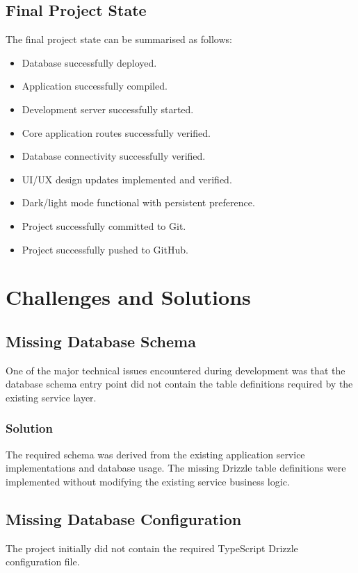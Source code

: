 \documentclass[12pt,a4paper]{report}
\begin{document}
\section{Final Project State}
The final project state can be summarised as follows:

\begin{itemize}[noitemsep]
  \item Database successfully deployed.
  \item Application successfully compiled.
  \item Development server successfully started.
  \item Core application routes successfully verified.
  \item Database connectivity successfully verified.
  \item UI/UX design updates implemented and verified.
  \item Dark/light mode functional with persistent preference.
  \item Project successfully committed to Git.
  \item Project successfully pushed to GitHub.
\end{itemize}

\chapter{Challenges and Solutions}

\section{Missing Database Schema}
One of the major technical issues encountered during development was that the
database schema entry point did not contain the table definitions required by
the existing service layer.

\subsection{Solution}
The required schema was derived from the existing application service
implementations and database usage.  The missing Drizzle table definitions were
implemented without modifying the existing service business logic.

\section{Missing Database Configuration}
The project initially did not contain the required TypeScript Drizzle
configuration file.
\end{document}
